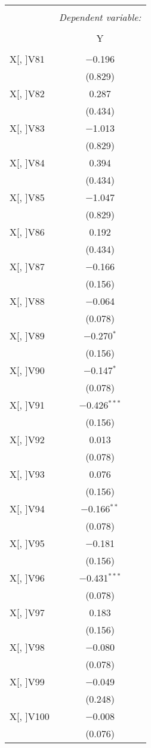 \documentclass[11pt, a4paper]{article}
\begin{document}
\begin{multicols}{2}
\FloatBarrier
\begin{center}
\begin{tabular}{@{\extracolsep{5pt}}lc} 
\\[-1.8ex]\hline 
\hline \\[-1.8ex] 
 & \multicolumn{1}{c}{\textit{Dependent variable:}} \\ 
\cline{2-2} 
\\[-1.8ex] & Y \\ 
\hline \\[-1.8ex] 
 X[, ]V81 & $-$0.196 \\ 
  & (0.829) \\  
 X[, ]V82 & 0.287 \\ 
  & (0.434) \\ 
 X[, ]V83 & $-$1.013 \\ 
  & (0.829) \\ 
 X[, ]V84 & 0.394 \\
  & (0.434) \\  
 X[, ]V85 & $-$1.047 \\ 
  & (0.829) \\  
 X[, ]V86 & 0.192 \\ 
  & (0.434) \\  
 X[, ]V87 & $-$0.166 \\ 
  & (0.156) \\  
 X[, ]V88 & $-$0.064 \\ 
  & (0.078) \\ 
 X[, ]V89 & $-$0.270$^{*}$ \\ 
  & (0.156) \\  
 X[, ]V90 & $-$0.147$^{*}$ \\ 
  & (0.078) \\  
 X[, ]V91 & $-$0.426$^{***}$ \\ 
  & (0.156) \\  
 X[, ]V92 & 0.013 \\ 
  & (0.078) \\  
 X[, ]V93 & 0.076 \\ 
  & (0.156) \\ 
 X[, ]V94 & $-$0.166$^{**}$ \\ 
  & (0.078) \\  
 X[, ]V95 & $-$0.181 \\ 
  & (0.156) \\ 
 X[, ]V96 & $-$0.431$^{***}$ \\ 
  & (0.078) \\ 
 X[, ]V97 & 0.183 \\ 
  & (0.156) \\ 
 X[, ]V98 & $-$0.080 \\ 
  & (0.078) \\
 X[, ]V99 & $-$0.049 \\ 
  & (0.248) \\  
 X[, ]V100 & $-$0.008 \\ 
  & (0.076) \\  
\end{tabular} 
\end{center}
\FloatBarrier


\end{multicols}
\end{document}
